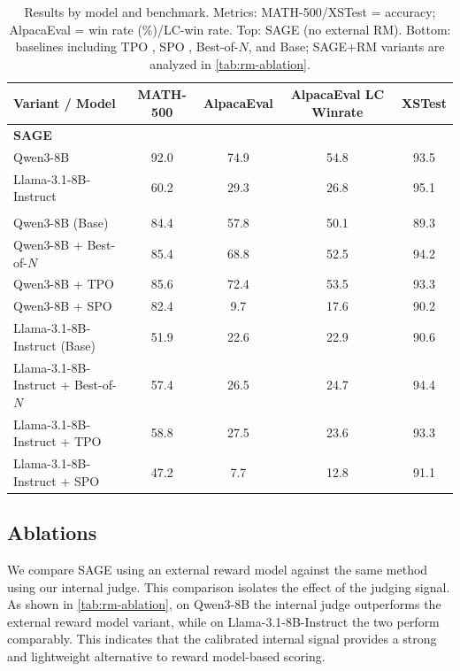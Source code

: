 \documentclass[letterpaper]{article} %
\newcommand{\method}{SAGE}
\begin{document}
\begin{table}[t]
\centering
\begin{small}
\begin{sc}
\begin{tabular}{lcccc}
\toprule
\textbf{Variant / Model} & \textbf{MATH-500} & \textbf{AlpacaEval} & \textbf{AlpacaEval LC Winrate} & \textbf{XSTest} \\
\midrule
\multicolumn{5}{l}{\textbf{\method{}}} \\
Qwen3-8B & 92.0 & 74.9 & \textcolor{orange!85!black}{54.8} & 93.5 \\
Llama-3.1-8B-Instruct & 60.2 & \textcolor{orange!85!black}{29.3} & \textcolor{orange!85!black}{26.8} & 95.1 \\
\addlinespace
\multicolumn{5}{l}{\textbf{Baselines}} \\
Qwen3-8B (Base) & 84.4 & 57.8 & 50.1 & 89.3 \\
Qwen3-8B + Best-of-\(N\) & 85.4 & 68.8 & \textcolor{orange!85!black}{52.5} & 94.2 \\
Qwen3-8B + TPO & 85.6 & 72.4 & \textcolor{orange!85!black}{53.5} & 93.3 \\
Qwen3-8B + SPO & 82.4 & 9.7 & 17.6 & 90.2 \\
Llama-3.1-8B-Instruct (Base) & \textcolor{orange!85!black}{51.9} & \textcolor{orange!85!black}{22.6} & \textcolor{orange!85!black}{22.9} & 90.6 \\
Llama-3.1-8B-Instruct + Best-of-\(N\) & 57.4 & \textcolor{orange!85!black}{26.5} & \textcolor{orange!85!black}{24.7} & 94.4 \\
Llama-3.1-8B-Instruct + TPO & 58.8 & \textcolor{orange!85!black}{27.5} & \textcolor{orange!85!black}{23.6} & 93.3 \\
Llama-3.1-8B-Instruct + SPO & 47.2 & 7.7 & 12.8 & 91.1 \\
\bottomrule
\end{tabular}
\end{sc}
\end{small}
\caption{Results by model and benchmark. Metrics: MATH-500/XSTest = accuracy; AlpacaEval = win rate (\%)/LC-win rate. Top: \method{} (no external RM). Bottom: baselines including TPO \citep{litest}, SPO \citep{xiang2025self}, Best-of-\(N\), and Base; \method{}+RM variants are analyzed in \cref{tab:rm-ablation}.}
\label{tab:results-by-model}
\end{table}

\subsection{Ablations}
\label{sec:ablations}
We compare \method{} using an external reward model against the same method using our internal judge. This comparison isolates the effect of the judging signal. As shown in \cref{tab:rm-ablation}, on Qwen3-8B the internal judge outperforms the external reward model variant, while on Llama-3.1-8B-Instruct the two perform comparably. This indicates that the calibrated internal signal provides a strong and lightweight alternative to reward model-based scoring.
\end{document}
